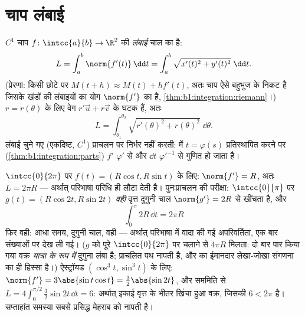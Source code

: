 \section{चाप लंबाई}

\begin{definition}[किसी चाप की लंबाई]\label{def:b1:curves:arclength}
$C^1$ चाप $f \colon \intcc{a}{b} \to \R^2$ की \emph{लंबाई}
चाल का  है:
\[
L = \int_a^b \norm{f'(t)}\,\dd t
= \int_a^b \sqrt{x'(t)^2 + y'(t)^2}\;\dd t .
\]
(प्रेरणा: किसी छोटे  पर $M(t + h) \approx M(t) + h f'(t)$, अतः चाप ऐसे
बहुभुज के निकट है जिसके खंडों की लंबाइयों का योग $\norm{f'}$ का 
है, \cref{thm:b1:integration:riemann}।)  $r = r(\theta)$ के लिए
वेग $r'\vec u + r\vec v$ के घटक  हैं, अतः
\[
L = \int_{\theta_1}^{\theta_2}
\sqrt{r'(\theta)^2 + r(\theta)^2}\;\dd\theta .
\]
लंबाई चुने गए (एकदिष्ट, $C^1$) प्राचलन पर निर्भर नहीं करती:  में $t =
\varphi(s)$ प्रतिस्थापित करने पर (\cref{thm:b1:integration:parts}) $f'$
$\varphi'$ से और $\dd t$ $\varphi'^{-1}$ से गुणित हो जाता है।
\end{definition}

\begin{example}[जाँच: वृत्त]\label{ex:b1:curves:circlelength}
$\intcc{0}{2\pi}$ पर $f(t) = (R\cos t, R\sin t)$ के लिए: $\norm{f'} = R$,
अतः $L = 2\pi R$ --- अर्थात् परिभाषा परिधि ही लौटा देती है। पुनःप्राचलन की
परीक्षा: $\intcc{0}{\pi}$ पर  $g(t) = (R\cos 2t, R\sin 2t)$
\emph{वही} वृत्त दुगुनी चाल $\norm{g'} = 2R$ से खींचता है, और
\[
\int_0^{\pi} 2R\,\dd t = 2\pi R
\]
फिर वही: आधा समय, दुगुनी चाल, वही  --- अर्थात् परिभाषा में वादा की गई
अपरिवर्तिता, एक बार संख्याओं पर देख ली गई। ($g$ को पूरे $\intcc{0}{2\pi}$ पर
चलाने से $4\pi R$ मिलता: दो बार पार किया गया वक्र \emph{यात्रा के रूप में}
दुगुना लंबा है;  प्राचलित पथ नापती है, और  का ईमानदार लेखा-जोखा
संगणना का ही हिस्सा है।) ऐस्ट्रॉयड $(\cos^3t, \sin^3t)$ के लिए: $\norm{f'} =
3\abs{\sin t\cos t} = \tfrac32\abs{\sin 2t}$, और सममिति से $L =
4\int_0^{\pi/2} \tfrac32\sin 2t\,\dd t = 6$: अर्थात् इकाई वृत्त के भीतर
खिंचा हुआ वक्र, जिसकी  $6 < 2\pi$ है। सप्ताहांत समस्या सबसे प्रसिद्ध
मेहराब को नापती है।
\end{example}

